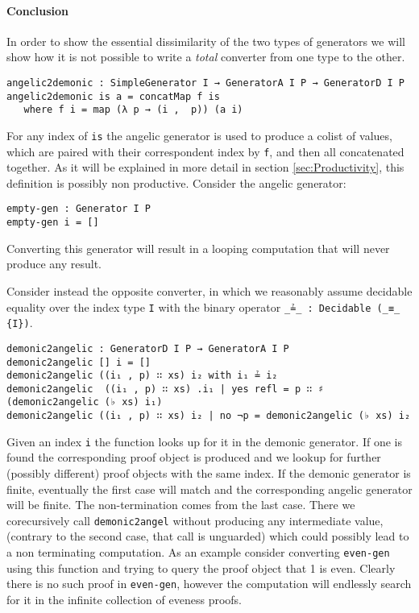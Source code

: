 \documentclass[10pt,a4paper]{article}
\begin{document}
\paragraph{Conclusion}
In order to show the essential dissimilarity of the two types of generators we will show how it is not possible to write a \emph{total} converter from one type to the other.
\begin{verbatim}
angelic2demonic : SimpleGenerator I → GeneratorA I P → GeneratorD I P
angelic2demonic is a = concatMap f is
   where f i = map (λ p → (i ,  p)) (a i) 
\end{verbatim}
For any index of \texttt{is} the angelic generator is used to produce a colist of 
values, which are paired with their correspondent index by \texttt{f}, and then all concatenated together.
As it will be explained in more detail in section \ref{sec:Productivity}, this definition is possibly non productive. Consider the angelic generator:
\begin{verbatim}
empty-gen : Generator I P
empty-gen i = [] 
\end{verbatim}
Converting this generator will result in a looping computation that will never produce any result.

Consider instead the opposite converter, in which we reasonably assume decidable equality over the index type \texttt{I} with the binary operator \texttt{\_≟\_ :\ Decidable (\_≡\_  \{I\})}.
\begin{verbatim}
demonic2angelic : GeneratorD I P → GeneratorA I P
demonic2angelic [] i = []
demonic2angelic ((i₁ , p) ∷ xs) i₂ with i₁ ≟ i₂
demonic2angelic  ((i₁ , p) ∷ xs) .i₁ | yes refl = p ∷ ♯ (demonic2angelic (♭ xs) i₁)
demonic2angelic ((i₁ , p) ∷ xs) i₂ | no ¬p = demonic2angelic (♭ xs) i₂
\end{verbatim}
Given an index \texttt{i} the function looks up for it in the demonic generator. If one is found the corresponding proof object is produced and we lookup for further (possibly different) proof objects with the same index.
If the demonic generator is finite, eventually the first case will match and the corresponding angelic generator will be finite. The non-termination comes from the last case. There we corecursively call \texttt{demonic2angel} without producing any intermediate value, (contrary to the second case, that call is unguarded) which could possibly lead to a non terminating computation.
As an example consider converting \texttt{even-gen} using this function and trying to query the proof object that 1 is even. Clearly there is no such proof in \texttt{even-gen}, however the computation will endlessly search for it in the infinite collection of eveness proofs.  
 
\end{document}

